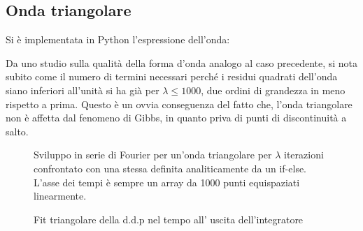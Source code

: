 \documentclass{article}[a4paper, oneside ,11pt]
\begin{document}
\subsection{Onda triangolare}
Si è implementata in Python l'espressione dell'onda: 

Da uno studio sulla qualità della forma d'onda analogo al caso precedente, si nota subito come il numero di termini necessari perché i residui quadrati dell'onda siano inferiori all'unità si ha già per $\lambda \leq 1000$, due ordini di grandezza in meno rispetto a prima. Questo è un ovvia conseguenza del fatto che, l'onda triangolare non è affetta dal fenomeno di Gibbs, in quanto priva di punti di discontinuità a salto.
\begin{figure}[!htb]
	\scalebox{0.55}{}\hfill \scalebox{0.55}{}
	\scalebox{0.55}{}\hfill \scalebox{0.55}{}
 	\caption{Sviluppo in serie di Fourier per un’onda triangolare per $\lambda$ iterazioni confrontato con una stessa definita analiticamente da un if-else. L'asse dei tempi è sempre un array da 1000 punti equispaziati linearmente. \label{plt:sqw}}
\end{figure}

\begin{figure}[!htb]
	\centering 
 	\caption{Fit triangolare della d.d.p nel tempo  all' uscita dell'integratore \label{plt:DSOtrg}}
\end{figure}
\end{document}

